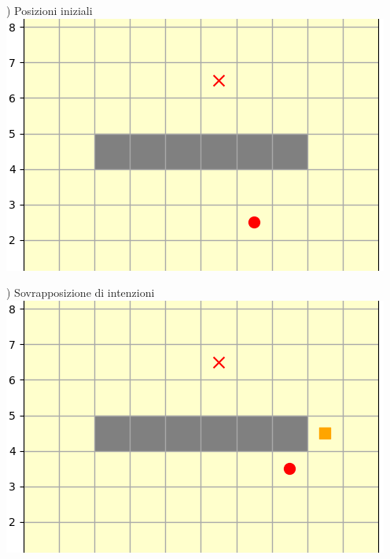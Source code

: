 \documentclass[12pt]{article}
\begin{document}
\begin{minipage}[ht]{0.45\linewidth}
) Posizioni iniziali
\includegraphics[width=\textwidth]{SimulazioniNavigazione/1AGV_Walls/0.png}
\end{minipage}
\begin{minipage}[ht]{0.45\linewidth}
) Sovrapposizione di intenzioni
\includegraphics[width=\textwidth]{SimulazioniNavigazione/1AGV_Walls/1.png}
\end{minipage}\\

\vspace{1cm}
\end{document}
